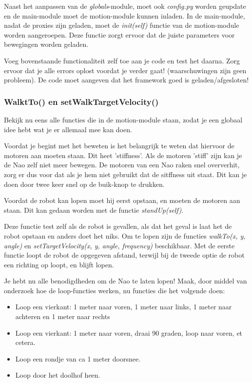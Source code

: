 \documentclass[a4paper, twoside]{article}
\begin{document}
Naast het aanpassen van de \textit{globals}-module, moet ook \textit{config.py} worden geupdate en de main-module moet de motion-module kunnen inladen.
In de main-module, nadat de proxies zijn geladen, moet de \textit{init(self)} functie van de motion-module worden aangeroepen. Deze functie zorgt ervoor dat de juiste parameters voor bewegingen worden geladen.

Voeg bovenstaande functionaliteit zelf toe aan je code en test het daarna. Zorg ervoor dat je alle errors oplost voordat je verder gaat! (waarschuwingen zijn geen probleem). De code moet aangeven dat het framework goed is geladen/afgesloten!

\subsubsection{WalktTo() en setWalkTargetVelocity()}
Bekijk nu eens alle functies die in de motion-module staan, zodat je een globaal idee hebt wat je er allemaal mee kan doen.

Voordat je begint met het beweten is het belangrijk te weten dat hiervoor de motoren aan moeten staan. Dit heet 'stiffness'. Als de motoren 'stiff' zijn kan je de Nao zelf niet meer bewegen. De motoren van een Nao raken snel oververhit, zorg er dus voor dat als je hem niet gebruikt dat de sitffness uit staat. Dit kan je doen door twee keer snel op de buik-knop te drukken.

Voordat de robot kan lopen moet hij eerst opstaan, en moeten de motoren aan staan. Dit kan gedaan worden met de functie \textit{standUp(self)}.

Deze functie test zelf als de robot is gevallen, als dat het geval is laat het de robot opstaan en anders doet het niks.
Om te lopen zijn de functies \textit{walkTo(x, y, angle)} en \textit{setTargetVelocity(x, y, angle, frequency)} beschikbaar.
Met de eerste functie loopt de robot de opgegeven afstand, terwijl bij de tweede optie de robot een richting op loopt, en blijft lopen.

Je hebt nu alle benodigdheden om de Nao te laten lopen! Maak, door middel van onderzoek hoe de loop-functies werken, nu functies die het volgende doen:
\begin{itemize}
\item Loop een vierkant: 1 meter naar voren, 1 meter naar links, 1 meter naar achteren en 1 meter naar rechts
\item Loop een vierkant: 1 meter naar voren, draai 90 graden, loop naar voren, et cetera.
\item Loop een rondje van ca 1 meter doorsnee.
\item Loop door het doolhof heen.
\end{itemize}
\end{document}
